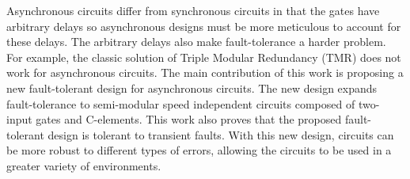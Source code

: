 \documentclass[12pt]{report}
\begin{document}
Asynchronous circuits differ from synchronous circuits in that the gates have arbitrary delays so asynchronous designs must be more meticulous to account for these delays.  The arbitrary delays also make fault-tolerance a harder problem.  For example, the classic solution of Triple Modular Redundancy (TMR) does not work for asynchronous circuits.  The main contribution of this work is proposing a new fault-tolerant design for asynchronous circuits.  The new design expands fault-tolerance to semi-modular speed independent circuits composed of two-input gates and C-elements.  This work also proves that the proposed fault-tolerant design is tolerant to transient faults.  With this new design, circuits can be more robust to different types of errors, allowing the circuits to be used in a greater variety of environments.




\end{document}
